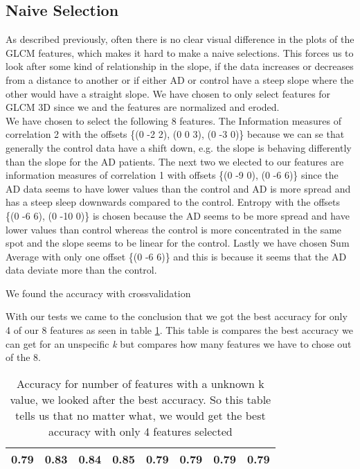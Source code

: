 \subsection{Naive Selection}
As described previously, often there is no clear visual difference in the plots of the GLCM features, which makes it hard to make a naive selections. This forces us to look after some kind of relationship in the slope, if the data increases or decreases from a distance to another or if either AD or control have a steep slope where the other would have a straight slope. We have chosen to only select features for GLCM 3D since we  and the features are normalized and eroded.\\
We have chosen to select the following 8 features. The Information measures of correlation 2 with the offsets \{(0 -2 2), (0 0 3), (0 -3 0)\} because we can se that generally the control data have a shift down, e.g. the slope is behaving differently than the slope for the AD patients. The next two we elected to our features are information measures of correlation 1 with offsets \{(0 -9 0), (0 -6 6)\} since the AD data seems to have lower values than the control and AD is more spread and has a steep sleep downwards compared to the control. Entropy with the offsets \{(0 -6 6), (0 -10 0)\} is chosen because the AD seems to be more spread and have lower values than control whereas the control is more concentrated in the same spot and the slope seems to be linear for the control. Lastly we have chosen Sum Average with only one offset \{(0 -6 6)\} and this is because it seems that the AD data deviate more than the control.

We found the accuracy with crossvalidation

With our tests we came to the conclusion that we got the best accuracy for only 4 of our 8 features as seen in table \ref{tab:numberOfFeatures}. This table is compares the best accuracy we can get for an unspecific \textit{k} but compares how many features we have to chose out of the 8.

\begin{table}[H]
  \centering
    \begin{tabular}{|c|c|c|c|c|c|c|c|}
    \hline
    0.79  & 0.83  & 0.84  & 0.85  & 0.79  & 0.79  & 0.79  & 0.79 \\
    \hline
    \end{tabular}%
  \caption{Accuracy for number of features with a unknown k value, we looked after the best accuracy. So this table tells us that no matter what, we would get the best accuracy with only 4 features selected}\label{tab:numberOfFeatures}%
\end{table}%

